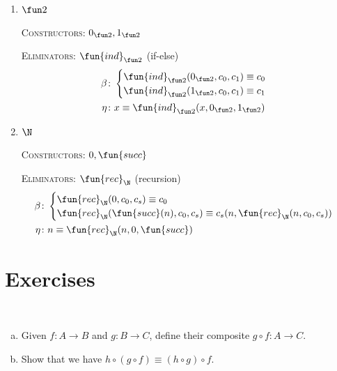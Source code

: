 \begin{enumerate}[-]
    \item $\fun2$
    
    \textsc{Constructors:} $0_{\fun2},1_{\fun2}$
    
    \textsc{Eliminators:} $\fun{ind}_{\fun2}$ (if-else)
    \begin{align*}
        \beta&\colon\begin{cases}
            \fun{ind}_{\fun2}(0_{\fun2},c_0,c_1)\equiv c_0\\
            \fun{ind}_{\fun2}(1_{\fun2},c_0,c_1)\equiv c_1
        \end{cases}\\
        \eta&\colon x\equiv\fun{ind}_{\fun2}(x,0_{\fun2},1_{\fun2})
    \end{align*}

    \item $\N$
    
    \textsc{Constructors:} $0,\fun{succ}$
    
    \textsc{Eliminators:} $\fun{rec}_\N$ (recursion)
    \begin{align*}
        \beta & \colon \begin{cases}
            \fun{rec}_\N(0, c_0,c_s)\equiv c_0\\
            \fun{rec}_\N(\fun{succ}(n),c_0,c_s)
                \equiv c_s(n,\fun{rec}_\N(n,c_0,c_s))
        \end{cases}\\
        \eta&\colon n\equiv\fun{rec}_\N(n,0,\fun{succ})
    \end{align*}
\end{enumerate}

\section{Exercises}

\begin{exr}\label{exr:function-composition}${}$
    \begin{enumerate}[a),font=\upshape]
        \item Given\/ $f \colon A \to B$ and\/ $g \colon B \to C$, define their composite\/ $g\circ f\colon A\to C$.
    
        \item Show that we have\/ $h\circ(g\circ f)\equiv(h\circ g)\circ f$.
    \end{enumerate}
\end{exr}


